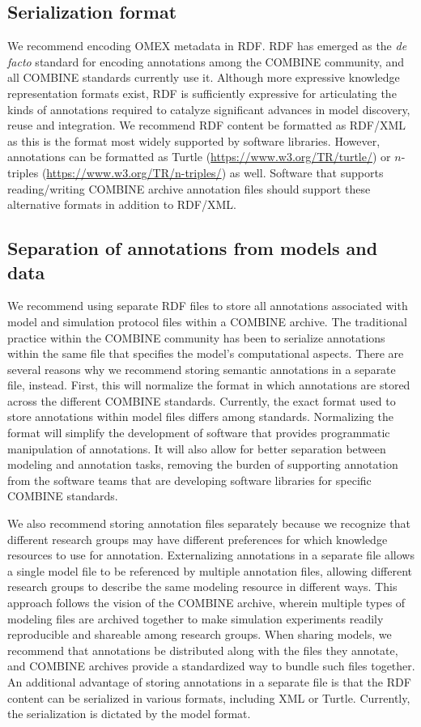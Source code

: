 \documentclass[pdftex,rgb,dvipsnames,svgnames,hyperref,table]{report}
\begin{document}
\subsection{Serialization format}
We recommend encoding OMEX metadata in RDF. RDF has emerged as the \textit{de facto} standard for encoding annotations among the COMBINE community, and all COMBINE standards currently use it. Although more expressive knowledge representation formats exist, RDF is sufficiently expressive for articulating the kinds of annotations required to catalyze significant advances in model discovery, reuse and integration. We recommend RDF content be formatted as RDF/XML as this is the format most widely supported by software libraries. However, annotations can be formatted as Turtle (\href{https://www.w3.org/TR/turtle/}{https://www.w3.org/TR/turtle/}) or $n$-triples (\url{https://www.w3.org/TR/n-triples/}) as well. Software that supports reading/writing COMBINE archive annotation files should support these alternative formats in addition to RDF/XML.

\subsection{Separation of annotations from models and data}
We recommend using separate RDF files to store all annotations associated with model and simulation protocol files within a COMBINE archive. The traditional practice within the COMBINE community has been to serialize annotations within the same file that specifies the model’s computational aspects. There are several reasons why we recommend storing semantic annotations in a separate file, instead. First, this will normalize the format in which annotations are stored across the different COMBINE standards. Currently, the exact format used to store annotations within model files differs among standards. Normalizing the format will simplify the development of software that provides programmatic manipulation of annotations. It will also allow for better separation between modeling and annotation tasks, removing the burden of supporting annotation from the software teams that are developing software libraries for specific COMBINE standards.

We also recommend storing annotation files separately because we recognize that different research groups may have different preferences for which knowledge resources to use for annotation. Externalizing annotations in a separate file allows a single model file to be referenced by multiple annotation files, allowing different research groups to describe the same modeling resource in different ways. This approach follows the vision of the COMBINE archive, wherein multiple types of modeling files are archived together to make simulation experiments readily reproducible and shareable among research groups. When sharing models, we recommend that annotations be distributed along with the files they annotate, and COMBINE archives provide a standardized way to bundle such files together. An additional advantage of storing annotations in a separate file is that the RDF content can be serialized in various formats, including XML or Turtle. Currently, the serialization is dictated by the model format.
\end{document}

